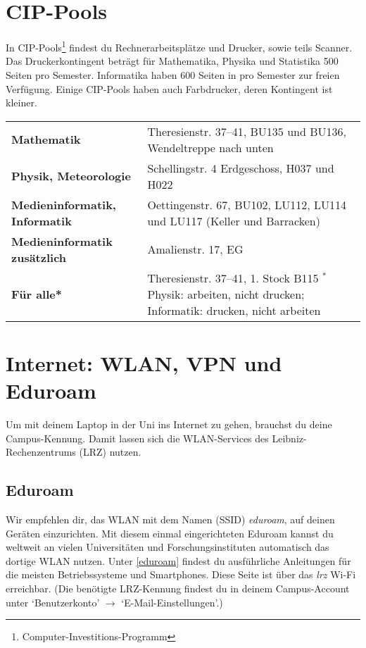 \section{CIP-Pools}
In CIP-Pools\footnote{Computer-Investitions-Programm} findest du Rechnerarbeitsplätze und Drucker, sowie teils Scanner. Das Druckerkontingent beträgt für Mathematika, Physika und Statistika 500 Seiten pro Semester. Informatika haben 600 Seiten in pro Semester zur freien Verfügung. Einige CIP-Pools haben auch Farbdrucker, deren Kontingent ist kleiner.

\begin{tabularx}{\linewidth}{lX}
\textbf{Mathematik}                   & Theresienstr. 37--41, BU135 und BU136, Wendeltreppe nach unten\\
\textbf{Physik, Meteorologie}         & Schellingstr. 4 Erdgeschoss, H037 und H022\\
\textbf{Medieninformatik, Informatik} & Oettingenstr. 67, BU102, LU112, LU114 und LU117 (Keller und Barracken)\\
\textbf{Medieninformatik zusätzlich}  & Amalienstr. 17, EG\\
\textbf{Für alle*}                    & Theresienstr. 37--41, 1. Stock B115 \newline
\footnotesize{$^*$Physik: arbeiten, nicht drucken; \newline $\phantom{^*}$Informatik: drucken, nicht arbeiten}
\end{tabularx}


\section{Internet: WLAN, VPN und Eduroam}

Um mit deinem Laptop in der Uni ins Internet zu gehen, brauchst du
deine Campus-Kennung. Damit lassen sich die WLAN-Services des
Leibniz-Rechen\-zentrums (LRZ) nutzen.

\subsection*{Eduroam}
Wir empfehlen dir, das WLAN mit dem Namen (SSID) \emph{eduroam}, auf deinen Geräten einzurichten. Mit diesem einmal eingerichteten Eduroam kannst du weltweit an vielen Universitäten und Forschungsinstituten automatisch das dortige WLAN nutzen. Unter \ref{eduroam} findest du ausführliche Anleitungen für die meisten Betriebssysteme und Smartphones.
Diese Seite ist über das \emph{lrz} Wi-Fi erreichbar.
(Die benötigte LRZ-Kennung findest du in deinem Campus-Account unter `Benutzerkonto' $\rightarrow$ `E-Mail-Einstellungen'.)


